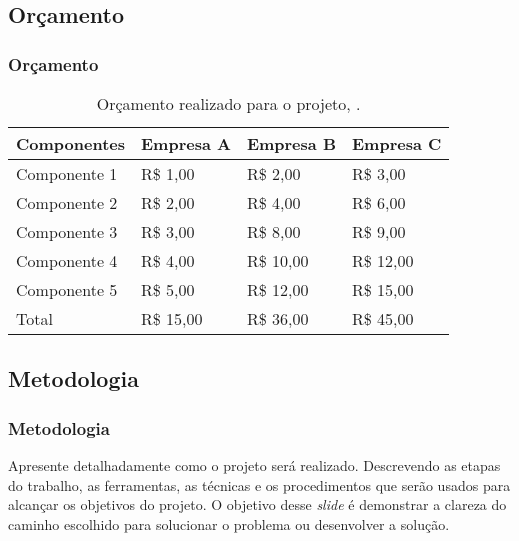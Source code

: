 \documentclass[hyperref={colorlinks=true,    
allcolors = blue,citecolor=blue}]{beamer} %
\begin{document}
\begin{frame}
\subsection{Orçamento}
\frametitle{Orçamento}

\begin{table}[!htp]
\centering
\begin{tabular}{ | m{2.5cm} | m{2.5cm}| m{2.5cm}| m{2.5cm}| } 
  \hline
  Componentes & Empresa A & Empresa B & Empresa C \\ 
  \hline
  Componente 1 & R\$ 1,00 & R\$ 2,00 & R\$ 3,00 \\  \hline
  Componente 2 & R\$ 2,00  & R\$ 4,00 & R\$ 6,00  \\  \hline
  Componente 3 & R\$ 3,00 & R\$ 8,00 & R\$ 9,00 \\  \hline
  Componente 4 & R\$ 4,00 & R\$  10,00 & R\$ 12,00  \\  \hline
  Componente 5 & R\$ 5,00  & R\$ 12,00 & R\$ 15,00 \\  \hline 
  \rowcolor{yellow}Total & R\$ 15,00  & R\$ 36,00 & R\$ 45,00 \\  \hline  
\end{tabular}
\caption{Orçamento realizado para o projeto, \cite{radional_2024, eletronica_system_2024, loja_severo_roth_2024}.}
\label{tabela2}
\end{table}


\end{frame}
\begin{frame}
\section{Metodologia}
\frametitle{Metodologia}

Apresente detalhadamente como o projeto será realizado. Descrevendo as etapas do trabalho, as ferramentas, as técnicas e os procedimentos que serão usados para alcançar os objetivos do projeto. O objetivo desse \textit{slide} é demonstrar a clareza do caminho escolhido para solucionar o problema ou desenvolver a solução.

\end{frame}
\end{document}
